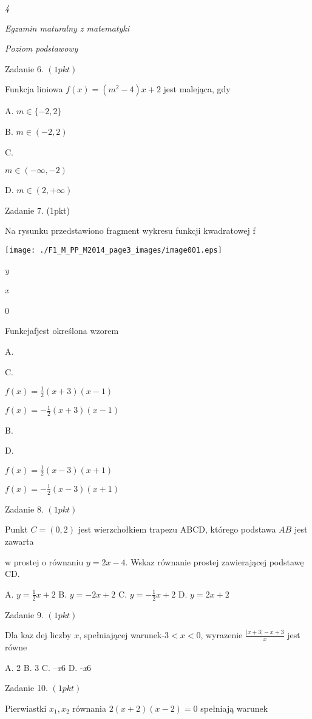\documentclass[a4paper,12pt]{article}
\begin{document}
{\it 4}

{\it Egzamin maturalny z matematyki}

{\it Poziom podstawowy}

Zadanie 6. $(1pkt)$

Funkcja liniowa $f(x)=(m^{2}-4)x+2$ jest malejąca, gdy

A. $m\in\{-2,2\}$

B. $m\in(-2,2)$

C.

$m\in(-\infty,-2)$

D. $m\in(2,+\infty)$

Zadanie 7. (1pkt)

Na rysunku przedstawiono fragment wykresu funkcji kwadratowej f
\begin{center}
\texttt{[image: ./F1\_M\_PP\_M2014\_page3\_images/image001.eps]}
\end{center}
{\it y}

{\it x}

0

Funkcjafjest określona wzorem

A.

C.

$f(x)=\displaystyle \frac{1}{2}(x+3)(x-1)$

$f(x)=-\displaystyle \frac{1}{2}(x+3)(x-1)$

B.

D.

$f(x)=\displaystyle \frac{1}{2}(x-3)(x+1)$

$f(x)=-\displaystyle \frac{1}{2}(x-3)(x+1)$

Zadanie 8. $(1pkt)$

Punkt $C=(0,2)$ jest wierzchołkiem trapezu ABCD, którego podstawa $AB$ jest zawarta

w prostej o równaniu $y=2x-4$. Wskaz równanie prostej zawierającej podstawę CD.

A. $y=\displaystyle \frac{1}{2}x+2$ B. $y=-2x+2$ C. $y=-\displaystyle \frac{1}{2}x+2$ D. $y=2x+2$

Zadanie 9. $(1pkt)$

Dla $\mathrm{k}\mathrm{a}\dot{\mathrm{z}}$ dej liczby $x$, spełniającej warunek-3$<x<0$, wyrazenie $\displaystyle \frac{|x+3|-x+3}{x}$ jest równe

A. 2 B. 3 C. --{\it x}6 D. -{\it x}6

Zadanie 10. $(1pkt)$

Pierwiastki $x_{1}, x_{2}$ równania $2(x+2)(x-2)=0$ spełniają warunek
\end{document}
